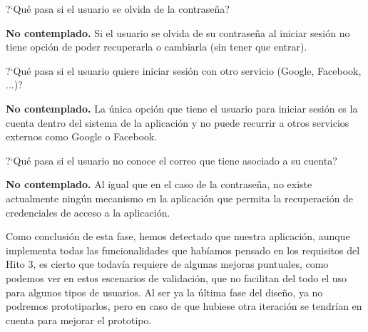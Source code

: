 \begin{escenario} %
    \centering
    ?`Qué pasa si el usuario se olvida de la contraseña?

    \begin{solucion}
        \centering
        \textbf{No contemplado.} Si el usuario se olvida de su contraseña al iniciar sesión no tiene opción de poder recuperarla o cambiarla (sin tener que entrar).
    \end{solucion}
\end{escenario}

\begin{escenario} %
    \centering
    ?`Qué pasa si el usuario quiere iniciar sesión con otro servicio (Google, Facebook, ...)?

    \begin{solucion}
        \centering
        \textbf{No contemplado.} La única opción que tiene el usuario para iniciar sesión es la cuenta dentro del sistema de la aplicación y no puede recurrir a otros
        servicios externos como Google o Facebook.
    \end{solucion}
\end{escenario}

\begin{escenario} %
    \centering
    ?`Qué pasa si el usuario no conoce el correo que tiene asociado a su cuenta?

    \begin{solucion}
        \centering
        \textbf{No contemplado.} Al igual que en el caso de la contraseña, no existe actualmente ningún mecanismo en la aplicación que permita la recuperación de credenciales
        de acceso a la aplicación.
    \end{solucion}
\end{escenario}

Como conclusión de esta fase, hemos detectado que nuestra aplicación, aunque implementa todas las funcionalidades que habíamos pensado en los requisitos del Hito 3, es cierto 
que todavía requiere de algunas mejoras puntuales, como podemos ver en estos escenarios de validación, que no facilitan del todo el uso para algunos tipos de usuarios. Al ser
ya la última fase del diseño, ya no podremos prototiparlos, pero en caso de que hubiese otra iteración se tendrían en cuenta para mejorar el prototipo.
